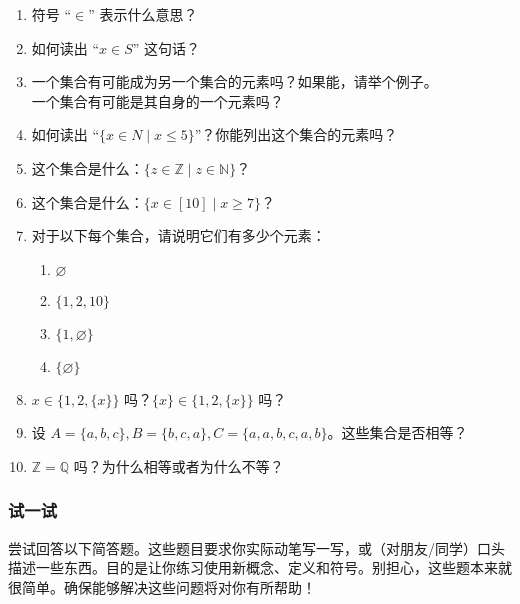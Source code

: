 \begin{enumerate}[label=(\arabic*)]
    \item 符号 ``$\in$'' 表示什么意思？
    \item 如何读出 ``$x \in S$'' 这句话？
    \item 一个集合有可能成为另一个集合的元素吗？如果能，请举个例子。\\
    一个集合有可能是其自身的一个元素吗？
    \item 如何读出 ``$\{x \in N \mid x \le 5\}$''？你能列出这个集合的元素吗？
    \item 这个集合是什么：$\{z \in \mathbb{Z} \mid z \in \mathbb{N}\}$？
    \item 这个集合是什么：$\{x \in [10] \mid x \ge 7\}$？
    \item 对于以下每个集合，请说明它们有多少个元素：
        \begin{enumerate}[label=(\alph*)]
            \item $\varnothing$
            \item $\{1, 2, 10\}$
            \item $\{1, \varnothing\}$
            \item $\{\varnothing\}$
        \end{enumerate}
    \item $x \in \{ 1, 2, \{x\} \}$ 吗？$\{x\} \in \{ 1, 2, \{x\} \}$ 吗？
    \item 设 $A = \{a, b, c\}, B = \{b, c, a\}, C = \{a, a, b, c, a, b\}$。这些集合是否相等？
    \item $\mathbb{Z} = \mathbb{Q}$ 吗？为什么相等或者为什么不等？
\end{enumerate}

\subsubsection*{试一试}

尝试回答以下简答题。这些题目要求你实际动笔写一写，或（对朋友/同学）口头描述一些东西。目的是让你练习使用新概念、定义和符号。别担心，这些题本来就很简单。确保能够解决这些问题将对你有所帮助！

